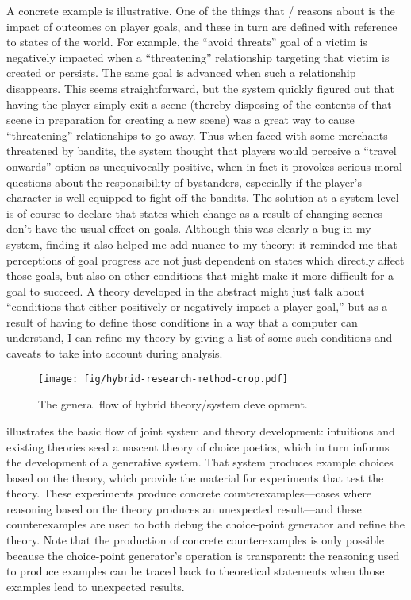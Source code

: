A concrete example is illustrative.
%
One of the things that \dunyazad/ reasons about is the impact of outcomes on player goals, and these in turn are defined with reference to states of the world.
%
For example, the ``avoid threats'' goal of a victim is negatively impacted when a ``threatening'' relationship targeting that victim is created or persists.
%
The same goal is advanced when such a relationship disappears.
%
This seems straightforward, but the system quickly figured out that having the player simply exit a scene (thereby disposing of the contents of that scene in preparation for creating a new scene) was a great way to cause ``threatening'' relationships to go away.
%
Thus when faced with some merchants threatened by bandits, the system thought that players would perceive a ``travel onwards'' option as unequivocally positive, when in fact it provokes serious moral questions about the responsibility of bystanders, especially if the player's character is well-equipped to fight off the bandits.
%
The solution at a system level is of course to declare that states which change as a result of changing scenes don't have the usual effect on goals.
%
Although this was clearly a bug in my system, finding it also helped me add nuance to my theory: it reminded me that perceptions of goal progress are not just dependent on states which directly affect those goals, but also on other conditions that might make it more difficult for a goal to succeed.
%
A theory developed in the abstract might just talk about ``conditions that either positively or negatively impact a player goal,'' but as a result of having to define those conditions in a way that a computer can understand, I can refine my theory by giving a list of some such conditions and caveats to take into account during analysis.

\begin{figure}[!b]
\centering
\texttt{[image: fig/hybrid-research-method-crop.pdf]}
\caption[Hybrid Research Method]{The general flow of hybrid theory/system development.}
\label{fig:hybrid-research-method}
\end{figure}


 illustrates the basic flow of joint system and theory development: intuitions and existing theories seed a nascent theory of choice poetics, which in turn informs the development of a generative system.
%
That system produces example choices based on the theory, which provide the material for experiments that test the theory.
%
These experiments produce concrete counterexamples---cases where reasoning based on the theory produces an unexpected result---and these counterexamples are used to both debug the choice-point generator and refine the theory.
%
Note that the production of concrete counterexamples is only possible because the choice-point generator's operation is transparent: the reasoning used to produce examples can be traced back to theoretical statements when those examples lead to unexpected results.


